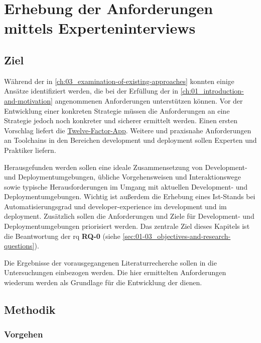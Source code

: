 \section{Erhebung der Anforderungen mittels Experteninterviews}
\label{sec:04-01_collection-of-requirements-using-expert-interviews}

\subsection{Ziel}
\label{subsec:04-01-01_goal}

Während der  in \autoref{ch:03_examination-of-existing-approaches} konnten einige Ansätze identifiziert werden, die bei der Erfüllung der in \autoref{ch:01_introduction-and-motivation} angenommenen Anforderungen unterstützen können. Vor der Entwicklung einer konkreten Strategie müssen die Anforderungen an eine  Strategie jedoch noch konkreter und sicherer ermittelt werden. Einen ersten Vorschlag liefert die \hyperref[sec:03-05_concept-of-twelve-factor-app]{Twelve-Factor-App}. Weitere und praxisnahe Anforderungen an Toolchains in den Bereichen \Gls{development} und \Gls{deployment} sollen Experten und Praktiker liefern.

Herausgefunden werden sollen eine ideale Zusammensetzung von Development- und Deploymentumgebungen, übliche Vorgehensweisen und Interaktionswege sowie typische Herausforderungen im Umgang mit aktuellen Development- und Deploymentumgebungen. Wichtig ist außerdem die Erhebung eines Ist-Stands bei Automatisierungsgrad und \Gls{developer-experience} im \Gls{development} und im \Gls{deployment}. Zusätzlich sollen die Anforderungen und Ziele für Development- und Deploymentumgebungen priorisiert werden. Das zentrale Ziel dieses Kapitels ist die Beantwortung der \acrlong{rq} \textbf{RQ-0} (siehe \autoref{sec:01-03_objectives-and-research-questions}).

Die Ergebnisse der vorausgegangenen Literaturrecherche sollen in die Untersuchungen einbezogen werden. Die hier ermittelten Anforderungen wiederum werden als Grundlage für die Entwicklung der  dienen.

\subsection{Methodik}
\label{subsec:04-01-02_methodology}

\subsubsection{Vorgehen}
\label{subsubsec:04-01-02-01_procedure}


